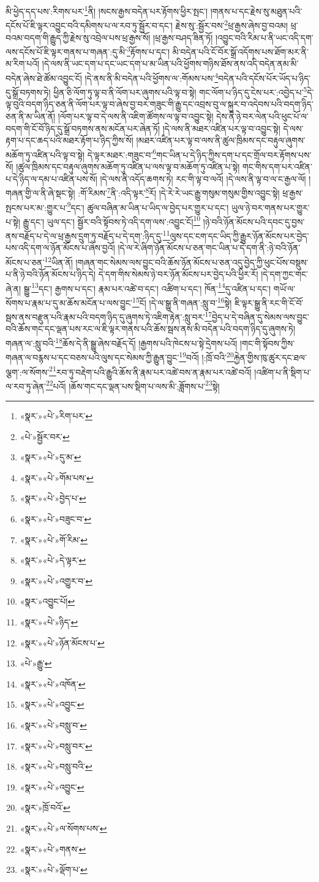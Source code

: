 མི་ཕྱེད་དད་པས་:རིགས་པར་\footnote{«སྣར་»«པེ་»རིག་པར་}ནི། །སངས་རྒྱས་བདེན་པར་རྟོགས་ཕྱིར་སྤང་། །གནས་པ་དང་རྗེས་སུ་མཐུན་པའི་དངོས་པོ་ཇི་ལྟར་འབྱུང་བའི་དམིགས་པ་ལ་རབ་ཏུ་སྦྱོར་བ་དང་། རྗེས་སུ་:སྦྱོར་བས་\footnote{«པེ་»སྦྱོར་བར་}ཕྲ་རྒྱས་ཞེས་བྱ་བའམ། ཕྲ་བའམ་བདག་གི་རྒྱུད་ཀྱི་རྗེས་སུ་འབྲེལ་པས་ཕྲ་རྒྱས་སོ། །ཕྲ་རྒྱས་བཤད་ཟིན་ཏོ། །འབྱུང་བའི་རིམ་པ་ནི་ཡང་འདི་དག་ལས་དངོས་པོ་ཇི་ལྟར་གནས་པ་གཞན་:དུ་མི་\footnote{«སྣར་»«པེ་»དུ་མ་}རྟོགས་པ་དང་། མི་བདེན་པའི་ངོ་བོར་སྒྲོ་འདོགས་པས་ཐོག་མར་ནི་མ་རིག་པའོ། །དེ་ལས་ནི་ཡང་དག་པ་དང་ཡང་དག་པ་མ་ཡིན་པའི་ཕྱོགས་གཉིས་ཐོས་ནས་འདི་བདེན་ནམ་མི་བདེན་ཞེས་ཐེ་ཚོམ་འབྱུང་ངོ། །དེ་ནས་ནི་མི་བདེན་པའི་ཕྱོགས་ལ་:གོམས་པས་\footnote{«སྣར་»«པེ་»གོམ་པས་}བདེན་པའི་དངོས་པོར་ཡོད་པ་ཉིད་དུ་སྒྲོ་བཏགས་ཏེ། ཕྱིན་ཅི་ལོག་ཏུ་ལྟ་བ་ནི་ལོག་པར་ཞུགས་པའི་ལྟ་བ་སྟེ། གང་ལོག་པ་ཉིད་དུ་ངེས་པར་:འབྱེད་པ་\footnote{«སྣར་»«པེ་»བྱེད་པ་}དེ་ལྟ་བུའི་བདག་ཉིད་ཅན་ནི་ལོག་པར་ལྟ་བ་ཞེས་བྱ་བར་གཟུང་གི་རྒྱུ་དང་འབྲས་བུ་ལ་སྐུར་བ་འདེབས་པའི་བདག་ཉིད་ཅན་ནི་མ་ཡིན་ནོ། །ལོག་པར་ལྟ་བ་དེ་ལས་ནི་འཇིག་ཚོགས་ལ་ལྟ་བ་འབྱུང་སྟེ། དེས་ནི་ཉེ་བར་ལེན་པའི་ཕུང་པོ་ལ་བདག་གི་ངོ་བོ་ཉིད་དུ་སྒྲོ་བཏགས་ནས་མངོན་པར་ཞེན་ཏོ། །དེ་ལས་ནི་མཐར་འཛིན་པར་ལྟ་བ་འབྱུང་སྟེ། དེ་ལས་རྟག་པ་དང་ཆད་པའི་མཐར་རྟོག་པ་ཉིད་ཀྱིས་སོ། །མཐར་འཛིན་པར་ལྟ་བ་ལས་ནི་ཚུལ་ཁྲིམས་དང་བརྟུལ་ཞུགས་མཆོག་ཏུ་འཛིན་པའི་ལྟ་བ་སྟེ། དེ་ལྟར་མཐར་:གཟུང་བ་\footnote{«སྣར་»«པེ་»བཟུང་བ་}གང་ཡིན་པ་དེ་ཉིད་ཀྱིས་དག་པ་དང་གྲོལ་བར་རྟོགས་པས་སོ། །ཚུལ་ཁྲིམས་དང་བརྟུལ་ཞུགས་མཆོག་ཏུ་འཛིན་པ་ལས་ལྟ་བ་མཆོག་ཏུ་འཛིན་པ་སྟེ། གང་གིས་དག་པར་འཛིན་པ་དེ་ཉིད་ལ་དམ་པ་འཛིན་པས་སོ། །དེ་ལས་ནི་འདོད་ཆགས་ཏེ། རང་གི་ལྟ་བ་ལའོ། །དེ་ལས་ནི་ལྟ་བ་ལ་ང་རྒྱལ་ལོ། །གཞན་གྱི་ལ་ནི་ཞེ་སྡང་སྟེ། :གོ་རིམས་\footnote{«སྣར་»«པེ་»གོ་རིམ་}ནི་:འདི་ལྟར་\footnote{«སྣར་»«པེ་»དེ་ལྟར་}རོ། །དེ་རེ་རེ་ཡང་རྒྱུ་གསུམ་གསུམ་གྱིས་འབྱུང་སྟེ། ཕྲ་རྒྱས་སྤངས་པར་མ་:གྱུར་པ་\footnote{«སྣར་»«པེ་»འགྱུར་བ་}དང་། ཚུལ་བཞིན་མ་ཡིན་པ་ཡིད་ལ་བྱེད་པར་གྱུར་པ་དང་། ཡུལ་ཉེ་བར་གནས་པར་གྱུར་པ་སྟེ། རྒྱུ་དང་། ཡུལ་དང་། སྦྱོར་བའི་སྟོབས་ཏེ་འདི་དག་ལས་:འབྱུང་ངོ།\footnote{«སྣར་»འབྱུང་པོ།} །ཉེ་བའི་ཉོན་མོངས་པའི་དབང་དུ་བྱས་ནས་བརྗོད་པ་དེ་ལ་ཕྲ་རྒྱས་དྲུག་ཏུ་བརྗོད་པ་དེ་དག་:ཉིད་དུ་\footnote{«སྣར་»«པེ་»ཉིད་}ལུས་དང་ངག་དང་ཡིད་ཀྱི་རྒྱུར་ཉོན་མོངས་པར་བྱེད་པས་འདི་དག་ལ་ཉོན་མོངས་པ་ཞེས་བྱའོ། །དེ་ལ་རེ་ཞིག་ཉོན་མོངས་པ་ཅན་གང་ཡིན་པ་དེ་དག་ནི་:ཉེ་བའི་ཉོན་མོངས་པ་ཅན་\footnote{«སྣར་»«པེ་»ཉོན་མོངས་པ་}ཡིན་ནོ། །གཞན་གང་སེམས་ལས་བྱུང་བའི་ཆོས་ཉོན་མོངས་པ་ཅན་འདུ་བྱེད་ཀྱི་ཕུང་པོས་བསྡུས་པ་ནི་ཉེ་བའི་ཉོན་མོངས་པ་ཉིད་དེ། དེ་དག་གིས་སེམས་ཉེ་བར་ཉོན་མོངས་པར་བྱེད་པའི་ཕྱིར་རོ། །དེ་དག་ཀྱང་གང་ཞེ་ན། སྒྱུ་\footnote{«པེ་»རྒྱུ་}དང་། རྒྱགས་པ་དང་། རྣམ་པར་འཚེ་བ་དང་། འཚིག་པ་དང་། ཁོན་\footnote{«སྣར་»«པེ་»འཁོན་}དུ་འཛིན་པ་དང་། གཡོ་ལ་སོགས་པ་རྣམ་པ་དུ་མ་ཆོས་མངོན་པ་ལས་བྱུང་\footnote{«སྣར་»«པེ་»འབྱུང་}ངོ། །དེ་ལ་སྒྱུ་ནི་གཞན་:སླུ་བ་\footnote{«སྣར་»«པེ་»བསླུ་བ་}སྟེ། ཇི་ལྟར་སྒྱུ་ནི་རང་གི་ངོ་བོ་སྦས་ནས་བརྫུན་པའི་རྣམ་པའི་བདག་ཉིད་དུ་ཞུགས་ཏེ་འཇིག་རྟེན་:སླུ་བར་\footnote{«སྣར་»«པེ་»བསླུ་བར་}བྱེད་པ་དེ་བཞིན་དུ་སེམས་ལས་བྱུང་བའི་ཆོས་གང་དང་ལྡན་པས་རང་ལ་ཇི་ལྟར་གནས་པའི་ཆོས་སྦས་ནས་མི་བདེན་པའི་བདག་ཉིད་དུ་ཞུགས་ཏེ། གཞན་ལ་:སླུ་བའི་\footnote{«སྣར་»«པེ་»བསླུ་བའི་}ཆོས་དེ་ནི་སྒྱུ་ཞེས་བརྗོད་དོ། །རྒྱགས་པའི་ཁེངས་པ་སྟེ་དྲེགས་པའོ། །གང་གི་སྟོབས་ཀྱིས་གཞན་ལ་བརྙས་པ་དང་བཅས་པའི་ལུས་དང་སེམས་ཀྱི་རྒྱུན་བྱུང་\footnote{«སྣར་»«པེ་»འབྱུང་}བའོ། །:ཁྲོ་བའི་\footnote{«སྣར་»ཁྲོ་བའོ་}རྐྱེན་གྱིས་ཁུ་ཚུར་དང་ཐལ་ལྕག་:ལ་སོགས་\footnote{«སྣར་»«པེ་»ལ་སོགས་པས་}རབ་ཏུ་བརྡེག་པའི་རྒྱུའི་ཆོས་ནི་རྣམ་པར་འཚེ་བས་ན་རྣམ་པར་འཚེ་བའོ། །འཚིག་པ་ནི་སྡིག་པ་ལ་རབ་ཏུ་ཞེན་\footnote{«སྣར་»«པེ་»གནས་}པའོ། །ཆོས་གང་དང་ལྡན་པས་སྡིག་པ་ལས་མི་:ཟློགས་པ་\footnote{«སྣར་»«པེ་»ལྡོག་པ་}སྟེ། 